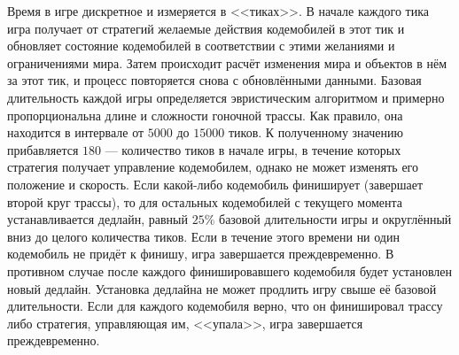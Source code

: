 Время в игре дискретное и измеряется в <<тиках>>. В начале каждого тика игра получает от стратегий желаемые действия кодемобилей в этот тик
и обновляет состояние кодемобилей в соответствии с этими желаниями и ограничениями мира. Затем происходит расчёт изменения мира и объектов в
нём за этот тик, и процесс повторяется снова с обновлёнными данными. Базовая длительность каждой игры определяется эвристическим алгоритмом
и примерно пропорциональна длине и сложности гоночной трассы. Как правило, она находится в интервале от $5000$ до $15000$ тиков. К
полученному значению прибавляется $180$ --- количество тиков в начале игры, в течение которых стратегия получает управление кодемобилем,
однако не может изменять его положение и скорость. Если какой-либо кодемобиль финиширует (завершает второй круг трассы), то для остальных
кодемобилей с текущего момента устанавливается дедлайн, равный $25\%$ базовой длительности игры и округлённый вниз до целого количества
тиков. Если в течение этого времени ни один кодемобиль не придёт к финишу, игра завершается преждевременно. В противном случае после каждого
финишировавшего кодемобиля будет установлен новый дедлайн. Установка дедлайна не может продлить игру свыше её базовой длительности. Если для
каждого кодемобиля верно, что он финишировал трассу либо стратегия, управляющая им, <<упала>>, игра завершается преждевременно.

